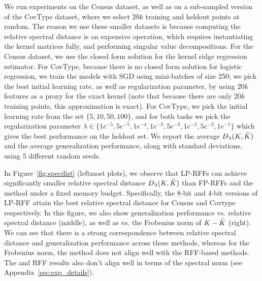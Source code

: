 We run experiments on the Census dataset, as well as on a sub-sampled version of the CovType dataset, where we select $20k$ training and heldout points at random.  The reason we use these smaller datasets is because computing the relative spectral distance is an expensive operation, which requires instantiating the kernel matrices fully, and performing singular value decompositions. For the Census dataset, we use the closed form solution for the kernel ridge regression estimator.  For CovType, because there is no closed form solution for logistic regression, we train the models with SGD using mini-batches of size 250; we pick the best initial learning rate, as well as regularization parameter, by using $20k$ \Nystrom features as a proxy for the exact kernel (note that because there are only $20k$ training points, this \Nystrom approximation is exact). For CovType, we pick the initial learning rate from the set $\{5, 10, 50, 100\}$, and for both tasks we pick the regularization parameter $\lambda \in \{1e^{-5}, 5e^{-5}, 1e^{-4}, 1e^{-3}, 5e^{-3}, 1e^{-2}, 5e^{-2}, 1e^{-1}\}$ which gives the best performance on the heldout set. We report the average $D_{\lambda}(K,\tilde{K})$ and the average generalization performance, along with standard deviations, using 5 different random seeds.

In Figure~\ref{fig:specdist} (leftmost plots), we observe that LP-RFFs can achieve significantly smaller relative spectral distance $D_{\lambda}(K,\tilde{K})$ than FP-RFFs and the \Nystrom method under a fixed memory budget. Specifically, the 8-bit and 4-bit versions of LP-RFF attain the best relative spectral distance for Census and Covtype respectively. In this figure, we also show generalization performance vs. relative spectral distance (middle), as well as vs. the Frobenius norm of $K-\tilde{K}$ (right).  We can see that there is a strong correspondence between relative spectral distance and generalization performance across these methods, whereas for the Frobenius norm, the \Nystrom method does not align well with the RFF-based methods. The \Nystrom and RFF results also don't align well in terms of the spectral norm (see Appendix~\ref{sec:exp_details}).

